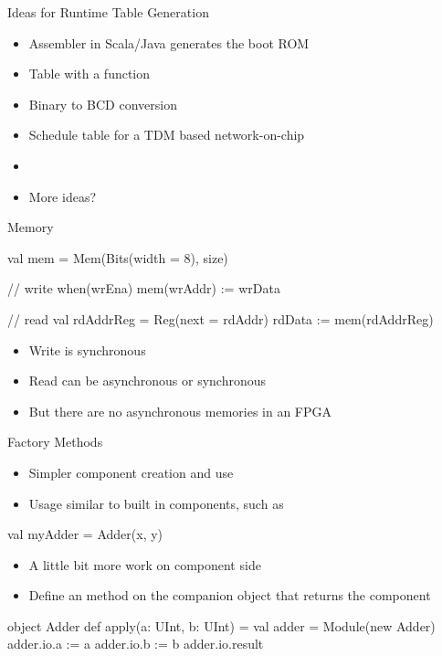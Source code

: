 \begin{frame}[fragile]{Ideas for Runtime Table Generation}
\begin{itemize}
\item Assembler in Scala/Java generates the boot ROM
\item Table with a  function
\item Binary to BCD conversion
\item Schedule table for a TDM based network-on-chip
\item 
\item More ideas?
\end{itemize}
\end{frame}

\begin{frame}[fragile]{Memory}
\begin{chisel}
val mem = Mem(Bits(width = 8), size)

// write
when(wrEna) {
  mem(wrAddr) := wrData
}

// read
val rdAddrReg = Reg(next = rdAddr)
rdData := mem(rdAddrReg)
\end{chisel}
\begin{itemize}
\item Write is synchronous
\item Read can be asynchronous or synchronous
\item But there are no asynchronous memories in an FPGA
\end{itemize}
\end{frame}

\begin{frame}[fragile]{Factory Methods}
\begin{itemize}
\item Simpler component creation and use
\item Usage similar to built in components, such as 
\end{itemize}
\begin{chisel}
val myAdder = Adder(x, y)
\end{chisel}
\begin{itemize}
\item A little bit more work on component side
\item Define an  method on the companion object that returns the component
\end{itemize}
\begin{chisel}
object Adder {
  def apply(a: UInt, b: UInt) = {
    val adder = Module(new Adder)
    adder.io.a := a
    adder.io.b := b
    adder.io.result
  }
}
\end{chisel}
\end{frame}

